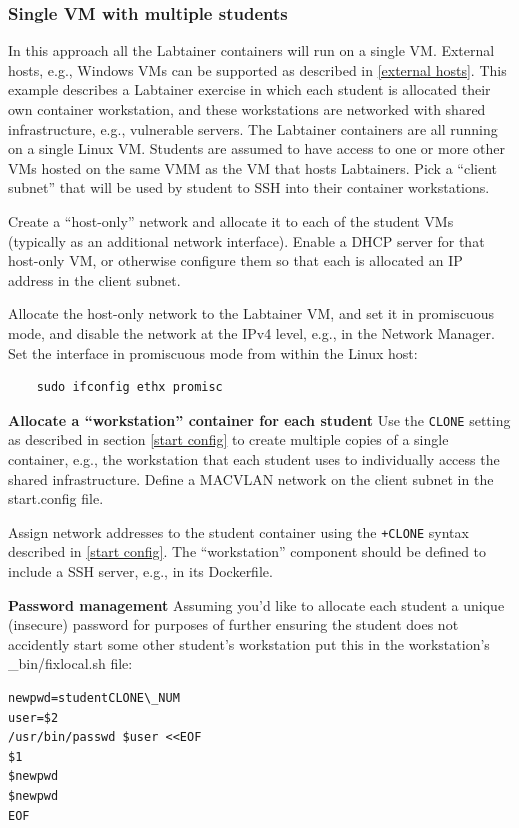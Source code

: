 \documentclass[12pt]{article}
\begin{document}
\subsubsection {Single VM with multiple students}
In this approach all the Labtainer containers will run on a single VM.  External hosts, e.g., Windows VMs can be 
supported as described in \ref{external hosts}.
This example describes a Labtainer exercise in which each
student is allocated their own container workstation, and these workstations are networked with shared infrastructure, e.g.,
vulnerable servers.
The Labtainer containers are all running on a single Linux VM.  Students are assumed to have access to one or more other
VMs hosted on the same VMM as the VM that hosts Labtainers.  Pick a ``client subnet'' that will be used by student to 
SSH into their container workstations.

Create a ``host-only'' network and allocate it to each of the student VMs (typically as an additional network interface).
Enable a DHCP server for that host-only VM, or otherwise configure them so that each is allocated an IP address in the
client subnet.

Allocate the host-only network to the Labtainer VM, and set it in promiscuous mode, and disable the network at the IPv4 level,
e.g., in the Network Manager.  Set the interface in promiscuous mode from within the Linux host:
\begin{verbatim}
    sudo ifconfig ethx promisc
\end{verbatim} 

\textbf {Allocate a ``workstation'' container for each student}
Use the {\tt CLONE} setting as described in section \ref{start config} to
create multiple copies of a single container, e.g., the workstation that each student
uses to individually access the shared infrastructure.   
Define a MACVLAN network on the client subnet in the start.config file.

Assign network addresses to the
student container using the {\tt +CLONE} syntax described in \ref{start config}.  
The ``workstation'' component should be defined to include a SSH server, e.g., in
its Dockerfile.

\textbf {Password management}
Assuming you'd like to allocate each student a unique (insecure) password for purposes of
further ensuring the student does not accidently start some other student's workstation put
this in the workstation's \_bin/fixlocal.sh file:
\begin{verbatim}
newpwd=studentCLONE\_NUM
user=$2
/usr/bin/passwd $user <<EOF
$1
$newpwd
$newpwd
EOF
\end{verbatim}
\end{document}
